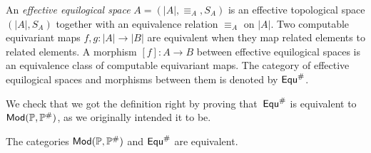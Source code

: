 \begin{definition}
  \label{def:eff}%
  An \emph{effective equilogical space} $A = (|A|, {\equiv_A}, S_A)$
  is an effective topological space $(|A|, S_A)$ together with an
  equivalence relation $\equiv_A$ on $|A|$.  Two computable
  equivariant maps $f,g: |A| \to |B|$ are equivalent when they map
  related elements to related elements.  A morphism $[f]: A \to B$
  between effective equilogical spaces is an equivalence class of
  computable equivariant maps.
  The category of effective equilogical
  spaces and morphisms between them is denoted by $\mathsf{Equ}^{\#}$.
\end{definition}

We check that we got the definition right by proving that~$\mathsf{Equ}^{\#}$ is 
equivalent to $\mathsf{Mod}(\mathbb{P}, \mathbb{P}^{\#})$, as we originally intended it to be.

\begin{proposition}
  \label{th:equivalence_eff_effperpp_effmodpp}%
  The categories $\mathsf{Mod}(\mathbb{P}, \mathbb{P}^{\#})$ and $\mathsf{Equ}^{\#}$ are
  equivalent.
\end{proposition}

